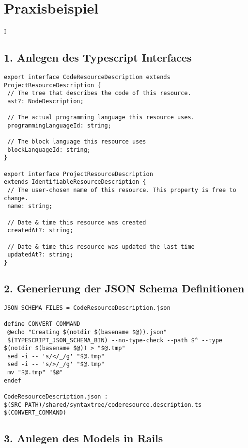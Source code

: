\section{Praxisbeispiel}

I
\subsection{1. Anlegen des Typescript Interfaces}

\begin{lstlisting}
export interface CodeResourceDescription extends ProjectResourceDescription {
 // The tree that describes the code of this resource.
 ast?: NodeDescription;

 // The actual programming language this resource uses.
 programmingLanguageId: string;

 // The block language this resource uses
 blockLanguageId: string;
}

export interface ProjectResourceDescription
extends IdentifiableResourceDescription {
 // The user-chosen name of this resource. This property is free to change.
 name: string;

 // Date & time this resource was created
 createdAt?: string;

 // Date & time this resource was updated the last time
 updatedAt?: string;
}
\end{lstlisting}
\subsection{2. Generierung der JSON Schema Definitionen}
\begin{lstlisting}
JSON_SCHEMA_FILES = CodeResourceDescription.json

define CONVERT_COMMAND
 @echo "Creating $(notdir $(basename $@)).json"
 $(TYPESCRIPT_JSON_SCHEMA_BIN) --no-type-check --path $^ --type $(notdir $(basename $@)) > "$@.tmp"
 sed -i -- 's/</_/g' "$@.tmp"
 sed -i -- 's/>/_/g' "$@.tmp"
 mv "$@.tmp" "$@"
endef

CodeResourceDescription.json : $(SRC_PATH)/shared/syntaxtree/coderesource.description.ts
$(CONVERT_COMMAND)
\end{lstlisting}

\subsection{3. Anlegen des Models in Rails}

